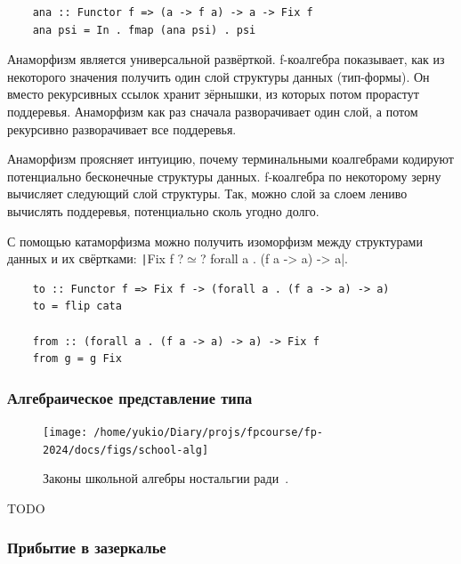 \begin{verbatim}
    ana :: Functor f => (a -> f a) -> a -> Fix f
    ana psi = In . fmap (ana psi) . psi
\end{verbatim}

Анаморфизм является универсальной развёрткой.
f-коалгебра показывает, как из некоторого значения получить один слой структуры данных (тип-формы).
Он вместо рекурсивных ссылок хранит зёрнышки, из которых потом прорастут поддеревья.
Анаморфизм как раз сначала разворачивает один слой, а потом рекурсивно разворачивает все поддеревья.

Анаморфизм проясняет интуицию, почему терминальными коалгебрами кодируют потенциально бесконечные структуры данных.
f-коалгебра по некоторому зерну вычисляет следующий слой структуры.
Так, можно слой за слоем лениво вычислять поддеревья, потенциально сколь угодно долго.

С помощью катаморфизма можно получить изоморфизм между структурами данных и их свёртками:
\texttt|Fix f ?$\simeq$? forall a . (f a -> a) -> a|.
\begin{verbatim}
    to :: Functor f => Fix f -> (forall a . (f a -> a) -> a)
    to = flip cata

    from :: (forall a . (f a -> a) -> a) -> Fix f
    from g = g Fix
\end{verbatim}


\subsubsection{Алгебраическое представление типа}

\begin{figure}[h!]
    \centering
    \texttt{[image: /home/yukio/Diary/projs/fpcourse/fp-2024/docs/figs/school-alg]}
    \caption{Законы школьной алгебры ностальгии ради~\cite{hinze2010reason}.}
    \label{fig:school-alg}
\end{figure}


\cite[глава 1]{maguire-types}


TODO %

\subsubsection{Прибытие в зазеркалье}

